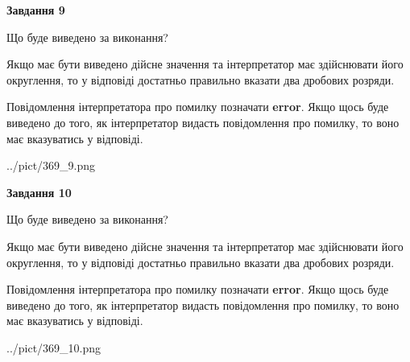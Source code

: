 \documentclass[12pt, ukrainian]{article}
\begin{document}
{\begin {Large}
{\begin {center}\textbf{Завдання 9}\end {center}}\par
Що буде виведено за виконання? \par

Якщо має бути виведено дійсне значення та інтерпретатор має здійснювати його округлення, 
то у відповіді достатньо правильно вказати два дробових розряди.

Повідомлення інтерпретатора про помилку позначати \textbf{error}.
Якщо щось буде виведено до того, як інтерпретатор видасть повідомлення про помилку, 
то воно має вказуватись у відповіді. \par

\begin{center}
	{../pict/369_9.png}
\end{center}
\newpage

{\begin {center}\textbf{Завдання 10}\end {center}}\par
Що буде виведено за виконання? \par

Якщо має бути виведено дійсне значення та інтерпретатор має здійснювати його округлення, 
то у відповіді достатньо правильно вказати два дробових розряди.

Повідомлення інтерпретатора про помилку позначати \textbf{error}.
Якщо щось буде виведено до того, як інтерпретатор видасть повідомлення про помилку, 
то воно має вказуватись у відповіді. \par

\begin{center}
	{../pict/369_10.png}
\end{center}
\newpage

\end {Large}}
\end{document}
